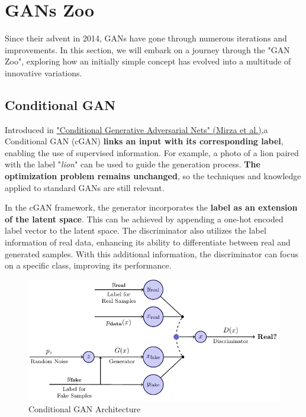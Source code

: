 \section{GANs Zoo}
Since their advent in 2014, GANs have gone through numerous iterations and improvements. In this section, we will embark on a journey through the "GAN Zoo", exploring how an initially simple concept has evolved into a multitude of innovative variations. 

\subsection{Conditional GAN}

Introduced in \href{https://arxiv.org/pdf/1411.1784}{"Conditional Generative Adversarial Nets" (Mirza et al.)},a Conditional GAN (cGAN) \textbf{links an input with its corresponding label}, enabling the use of supervised information. For example, a photo of a lion paired with the label "\textit{lion}" can be used to guide the generation process. \textbf{The optimization problem remains unchanged}, so the techniques and knowledge applied to standard GANs are still relevant.

In the cGAN framework, the generator incorporates the \textbf{label as an extension of the latent space}. This can be achieved by appending a one-hot encoded label vector to the latent space. The discriminator also utilizes the label information of real data, enhancing its ability to differentiate between real and generated samples. With this additional information, the discriminator can focus on a specific class, improving its performance.

\begin{figure}[!htbp]
    \centering
    \includegraphics[width=\linewidth]{tikz/chapter9 - Conditional GAN.pdf}
    \caption{Conditional GAN Architecture}
\end{figure}


